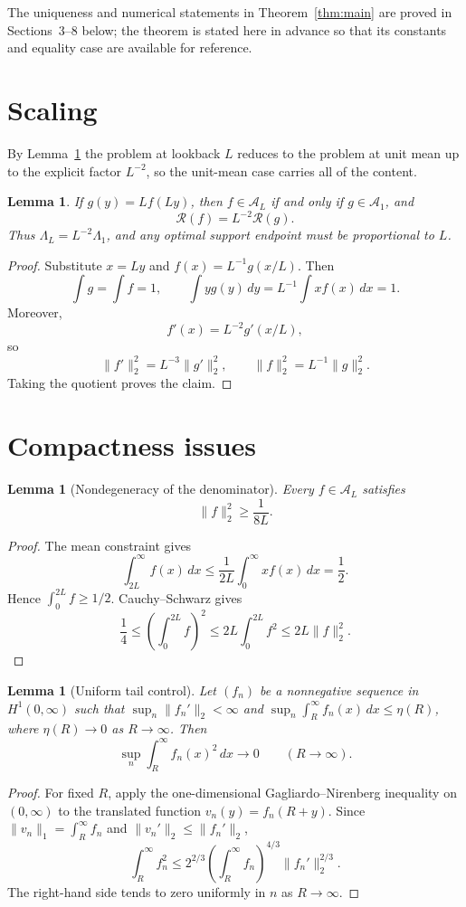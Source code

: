 \documentclass[11pt]{article}
\newtheorem{lemma}[theorem]{Lemma}
\theoremstyle{definition}
\theoremstyle{remark}
\newcommand{\A}{\mathcal A}
\newcommand{\Rcal}{\mathcal R}
\begin{document}
The uniqueness and numerical statements in Theorem~\ref{thm:main} are proved
in Sections~3--8 below; the theorem is stated here in advance so that its
constants and equality case are available for reference.

\section{Scaling}
By Lemma~\ref{lem:scaling} the problem at lookback $L$ reduces to the
problem at unit mean up to the explicit factor $L^{-2}$, so the unit-mean case
carries all of the content.
\begin{lemma}\label{lem:scaling}
If $g(y)=Lf(Ly)$, then $f\in\A_L$ if and only if $g\in\A_1$, and
\[
 \Rcal(f)=L^{-2}\Rcal(g).
\]
Thus $\Lambda_L=L^{-2}\Lambda_1$, and any optimal support endpoint must be proportional to $L$.
\end{lemma}
\begin{proof}
Substitute $x=Ly$ and $f(x)=L^{-1}g(x/L)$. Then
\[
 \int g=\int f=1,
 \qquad
 \int yg(y)\,dy=L^{-1}\int xf(x)\,dx=1.
\]
Moreover,
\[
 f'(x)=L^{-2}g'(x/L),
\]
so
\[
 \|f'\|_2^2=L^{-3}\|g'\|_2^2,
 \qquad
 \|f\|_2^2=L^{-1}\|g\|_2^2.
\]
Taking the quotient proves the claim.
\end{proof}

\section{Compactness issues}
\begin{lemma}[Nondegeneracy of the denominator]\label{lem:l2}
Every $f\in\A_L$ satisfies
\[
 \|f\|_2^2\geq\frac{1}{8L}.
\]
\end{lemma}
\begin{proof}
The mean constraint gives
\[
 \int_{2L}^\infty f(x)\,dx\leq\frac{1}{2L}\int_0^\infty xf(x)\,dx=\frac12.
\]
Hence $\int_0^{2L}f\geq1/2$. Cauchy--Schwarz gives
\[
 \frac14\leq\left(\int_0^{2L}f\right)^2
 \leq2L\int_0^{2L}f^2
 \leq2L\|f\|_2^2.
\]
\end{proof}

\begin{lemma}[Uniform tail control]\label{lem:tail}
Let $(f_n)$ be a nonnegative sequence in $H^1(0,\infty)$ such that
$\sup_n\|f_n'\|_2<\infty$ and
$\sup_n\int_R^\infty f_n(x)\,dx\leq\eta(R)$, where $\eta(R)\to0$ as
$R\to\infty$. Then
\[
 \sup_n\int_R^\infty f_n(x)^2\,dx\longrightarrow0
 \qquad(R\to\infty).
\]
\end{lemma}
\begin{proof}
For fixed $R$, apply the one-dimensional Gagliardo--Nirenberg inequality on
$(0,\infty)$ to the translated function $v_n(y)=f_n(R+y)$. Since
$\|v_n\|_1=\int_R^\infty f_n$ and $\|v_n'\|_2\leq\|f_n'\|_2$,
\[
 \int_R^\infty f_n^2
 \leq 2^{2/3}\left(\int_R^\infty f_n\right)^{4/3}
 \|f_n'\|_2^{2/3}.
\]
The right-hand side tends to zero uniformly in $n$ as $R\to\infty$.
\end{proof}
\end{document}
